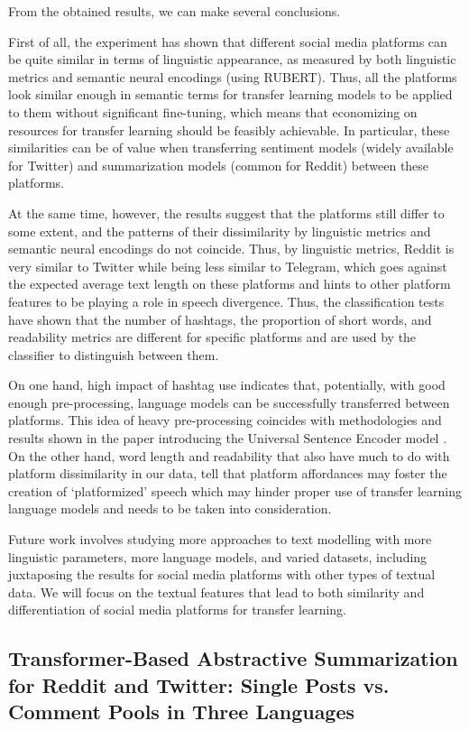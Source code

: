 From the obtained results, we can make several conclusions.

First of all, the experiment has shown that different social media platforms can be quite similar in terms of linguistic appearance, as measured by both linguistic metrics and semantic neural encodings (using RUBERT). Thus, all the platforms look similar enough in semantic terms for transfer learning models to be applied to them without significant fine-tuning, which means that economizing on resources for transfer learning should be feasibly achievable. In particular, these similarities can be of value when transferring sentiment models (widely available for Twitter) and summarization models (common for Reddit) between these platforms.

At the same time, however, the results suggest that the platforms still differ to some extent, and the patterns of their dissimilarity by linguistic metrics and semantic neural encodings do not coincide. Thus, by linguistic metrics, Reddit is very similar to Twitter while being less similar to Telegram, which goes against the expected average text length on these platforms and hints to other platform features to be playing a role in speech divergence. Thus, the classification tests have shown that the number of hashtags, the proportion of short words, and readability metrics are different for specific platforms and are used by the classifier to distinguish between them. 

On one hand, high impact of hashtag use indicates that, potentially, with good enough pre-processing, language models can be successfully transferred between platforms. This idea of heavy pre-processing coincides with methodologies and results shown in the paper introducing the Universal Sentence Encoder model \cite{CerYangKong}. On the other hand, word length and readability that also have much to do with platform dissimilarity in our data, tell that platform affordances may foster the creation of ‘platformized’ speech which may hinder proper use of transfer learning language models and needs to be taken into consideration.

Future work involves studying more approaches to text modelling with more linguistic parameters, more language models, and varied datasets, including juxtaposing the results for social media platforms with other types of textual data. We will focus on the textual features that lead to both similarity and differentiation of social media platforms for transfer learning.

\subsection{Transformer-Based Abstractive Summarization for Reddit and Twitter: Single Posts vs. Comment Pools in Three Languages}\label{subsec:ch5/sec4/sub2}

